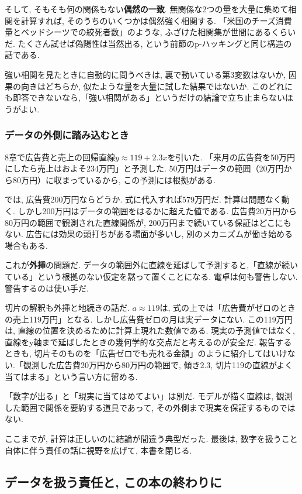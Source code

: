 そして, そもそも何の関係もない\textbf{偶然の一致}.
無関係な2つの量を大量に集めて相関を計算すれば, そのうちのいくつかは偶然強く相関する.
「米国のチーズ消費量とベッドシーツでの絞死者数」のような, ふざけた相関集が世間にあるくらいだ.
たくさん試せば偽陽性は当然出る, という前節のp-ハッキングと同じ構造の話である.

強い相関を見たときに自動的に問うべきは, 裏で動いている第3変数はないか, 因果の向きはどちらか, 似たような量を大量に試した結果ではないか.
このどれにも即答できないなら,「強い相関がある」というだけの結論で立ち止まらないほうがよい.

\subsubsection*{データの外側に踏み込むとき}

8章で広告費と売上の回帰直線$y \approx 119 + 2.3x$を引いた.
「来月の広告費を50万円にしたら売上はおよそ234万円」と予測した.
50万円はデータの範囲（20万円から80万円）に収まっているから, この予測には根拠がある.

では, 広告費200万円ならどうか.
式に代入すれば579万円だ. 計算は問題なく動く.
しかし200万円はデータの範囲をはるかに超えた値である.
広告費20万円から80万円の範囲で観測された直線関係が, 200万円まで続いている保証はどこにもない.
広告には効果の頭打ちがある場面が多いし, 別のメカニズムが働き始める場合もある.

これが\textbf{外挿}の問題だ.
データの範囲外に直線を延ばして予測すると,「直線が続いている」という根拠のない仮定を黙って置くことになる.
電卓は何も警告しない. 警告するのは使い手だ.

切片の解釈も外挿と地続きの話だ.
$a \approx 119$は, 式の上では「広告費がゼロのときの売上119万円」となる.
しかし広告費ゼロの月は実データにない.
この119万円は, 直線の位置を決めるために計算上現れた数値である. 現実の予測値ではなく, 直線をy軸まで延ばしたときの幾何学的な交点だと考えるのが安全だ.
報告するときも, 切片そのものを「広告ゼロでも売れる金額」のように紹介してはいけない.「観測した広告費20万円から80万円の範囲で, 傾き2.3, 切片119の直線がよく当てはまる」という言い方に留める.

「数字が出る」と「現実に当てはめてよい」は別だ.
モデルが描く直線は, 観測した範囲で関係を要約する道具であって, その外側まで現実を保証するものではない.

ここまでが, 計算は正しいのに結論が間違う典型だった.
最後は, 数字を扱うこと自体に伴う責任の話に視野を広げて, 本書を閉じる.


\subsection{データを扱う責任と, この本の終わりに}

